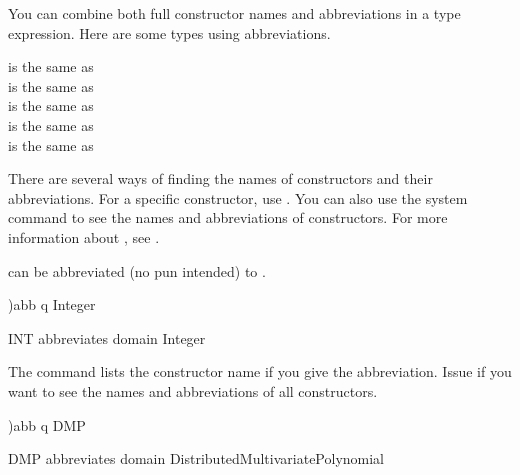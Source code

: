 You can combine both full constructor names and abbreviations
in a type expression.
Here are some types using abbreviations.
\begin{center}
 is the same as  \\
 is the same as  \\
 is the same as  \\
 is the same as  \\
 is the same as  \\
\end{center}

There are several ways of finding the names of constructors and
their abbreviations.
For a specific constructor, use .
You can also use the  system command to see the names
and abbreviations of constructors.
For more information about , see
.
\begin{xtc}
\begin{xtccomment}
 can be
abbreviated (no pun intended) to .
\end{xtccomment}
\begin{spadsrc}
)abb q Integer
\end{spadsrc}
\begin{SysCmdOutput}
   INT abbreviates domain Integer 
\end{SysCmdOutput}
\end{xtc}
\begin{xtc}
\begin{xtccomment}
The  command lists
the constructor name if you give the abbreviation.
Issue  if you want to see the names and abbreviations
of all \Language{} constructors.
\end{xtccomment}
\begin{spadsrc}
)abb q DMP
\end{spadsrc}
\begin{SysCmdOutput}
   DMP abbreviates domain DistributedMultivariatePolynomial 
\end{SysCmdOutput}
\end{xtc}
